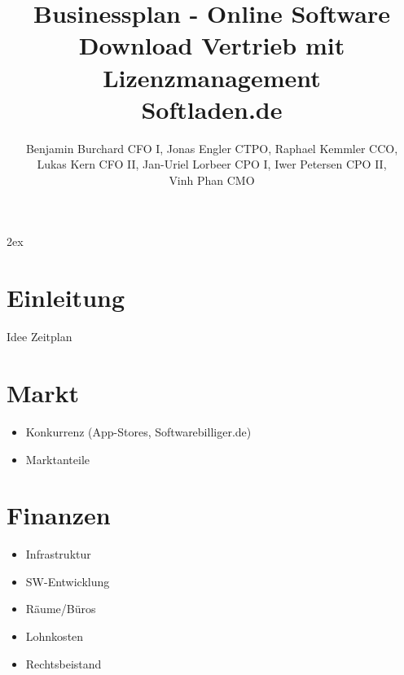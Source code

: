 \documentclass[draft=false
              ,paper=a4
              ,twoside=false
              ,fontsize=11pt
              ,headsepline
              ,BCOR10mm
              ,DIV11
              ]{scrbook}
\begin{document}
\parindent0mm
\parskip2ex

\frontmatter
\title{Businessplan - Online Software Download Vertrieb mit Lizenzmanagement\\Softladen.de}
\author{Benjamin Burchard CFO I, Jonas Engler CTPO, Raphael Kemmler CCO, \\Lukas Kern CFO II, Jan-Uriel Lorbeer CPO I, Iwer Petersen CPO II, \\Vinh Phan CMO}
\maketitle

\tableofcontents
\newpage

\mainmatter
\onehalfspacing

\chapter{Einleitung}
Idee
Zeitplan



\chapter{Markt}
\begin{itemize}
\item Konkurrenz (App-Stores, Softwarebilliger.de)
\item Marktanteile
\end{itemize}


\chapter{Finanzen}
\begin{itemize}
\item Infrastruktur
\item SW-Entwicklung
\item Räume/Büros
\item Lohnkosten
\item Rechtsbeistand
\end{itemize}
%
%
\end{document}
